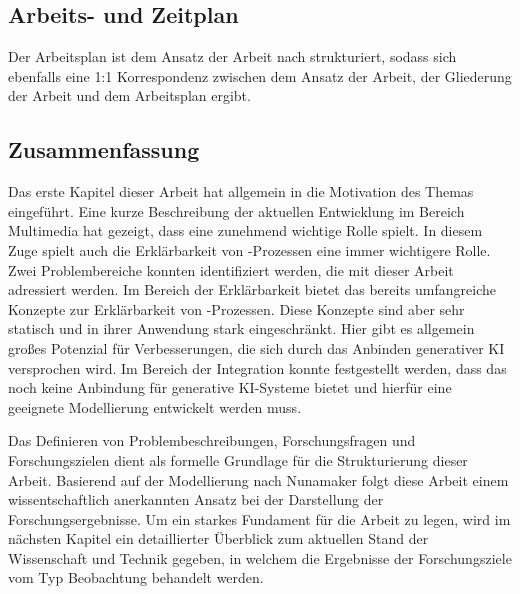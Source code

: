 \subsection{Arbeits- und Zeitplan}
\label{sec1:intro:subsec:work-time-plan}
Der Arbeitsplan ist dem Ansatz der Arbeit nach strukturiert, sodass sich ebenfalls eine 1:1 Korrespondenz zwischen dem Ansatz der Arbeit, der Gliederung der Arbeit und dem Arbeitsplan ergibt.



\clearpage

\subsection{Zusammenfassung}
\label{sec1:intro:subsec:summary}
Das erste Kapitel dieser Arbeit hat allgemein in die Motivation des Themas eingeführt.
Eine kurze Beschreibung der aktuellen Entwicklung im Bereich Multimedia hat gezeigt, dass \mmir{} eine zunehmend wichtige Rolle spielt.
In diesem Zuge spielt auch die Erklärbarkeit von \mmir{}-Prozessen eine immer wichtigere Rolle.
Zwei Problembereiche konnten identifiziert werden, die mit dieser Arbeit adressiert werden.
Im Bereich der Erklärbarkeit bietet das \gmaf{} bereits umfangreiche Konzepte zur Erklärbarkeit von \mmir{}-Prozessen.
Diese Konzepte sind aber sehr statisch und in ihrer Anwendung stark eingeschränkt.
Hier gibt es allgemein großes Potenzial für Verbesserungen, die sich durch das Anbinden generativer KI versprochen wird.
Im Bereich der Integration konnte festgestellt werden, dass das \gmaf{} noch keine Anbindung für generative KI-Systeme bietet und hierfür eine geeignete Modellierung entwickelt werden muss.

Das Definieren von Problembeschreibungen, Forschungsfragen und Forschungszielen dient als formelle Grundlage für die Strukturierung dieser Arbeit.
Basierend auf der Modellierung nach Nunamaker folgt diese Arbeit einem wissentschaftlich anerkannten Ansatz bei der Darstellung der Forschungsergebnisse.
Um ein starkes Fundament für die Arbeit zu legen, wird im nächsten Kapitel ein detaillierter Überblick zum aktuellen Stand der Wissenschaft und Technik gegeben, in welchem die Ergebnisse der Forschungsziele vom Typ Beobachtung behandelt werden.
